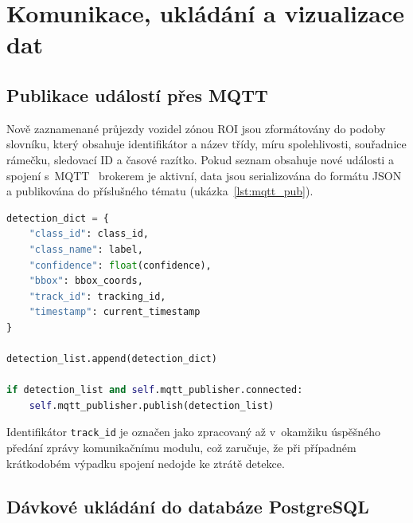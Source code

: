 
\section{Komunikace, ukládání a vizualizace dat}

\subsection{Publikace událostí přes MQTT}
Nově zaznamenané průjezdy vozidel zónou ROI jsou zformátovány do podoby slovníku, který obsahuje identifikátor a název třídy, míru spolehlivosti, souřadnice rámečku, sledovací ID a časové razítko. Pokud seznam obsahuje nové události a spojení s~MQTT~\cite{mqtt_oasis_2019} brokerem je aktivní, data jsou serializována do formátu JSON a publikována do příslušného tématu (ukázka~\ref{lst:mqtt_pub}).

\begin{lstlisting}[language=Python, caption={Sestavení a publikace detekčních událostí přes MQTT.}, label={lst:mqtt_pub}]
detection_dict = {
    "class_id": class_id,
    "class_name": label,
    "confidence": float(confidence),
    "bbox": bbox_coords,
    "track_id": tracking_id,
    "timestamp": current_timestamp
}

detection_list.append(detection_dict)

if detection_list and self.mqtt_publisher.connected:
    self.mqtt_publisher.publish(detection_list)
\end{lstlisting}

Identifikátor \texttt{track\_id} je označen jako zpracovaný až v~okamžiku úspěšného předání zprávy komunikačnímu modulu, což zaručuje, že při případném krátkodobém výpadku spojení nedojde ke ztrátě detekce.

\subsection{Dávkové ukládání do databáze PostgreSQL}

